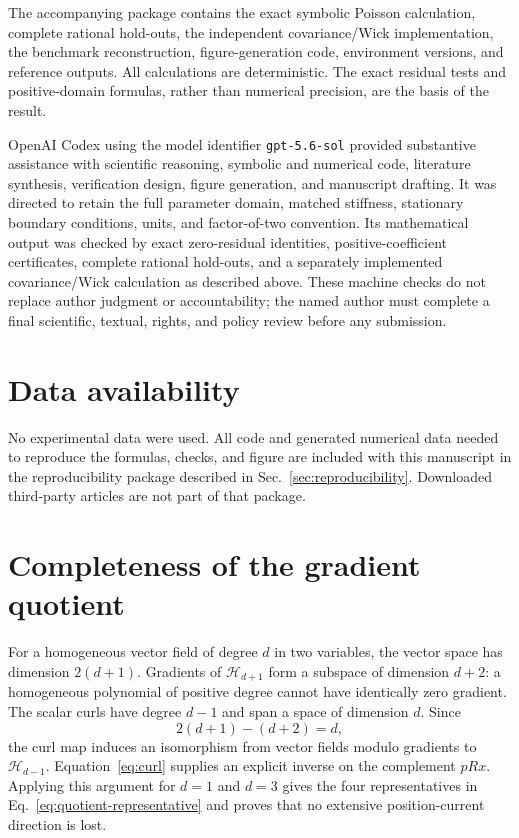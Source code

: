 \documentclass[aps,pre,reprint,amsmath,amssymb,superscriptaddress,nofootinbib]{revtex4-2}
\newcommand{\cH}{\mathcal{H}}
\begin{document}
The accompanying package contains the exact symbolic Poisson calculation,
complete rational hold-outs, the independent covariance/Wick implementation,
the benchmark reconstruction, figure-generation code, environment versions,
and reference outputs.  All calculations are deterministic.  The exact
residual tests and positive-domain formulas, rather than numerical precision,
are the basis of the result.

OpenAI Codex using the model identifier \texttt{gpt-5.6-sol} provided
substantive assistance with scientific reasoning, symbolic and numerical code,
literature synthesis, verification design, figure generation, and manuscript
drafting.  It was directed to retain the full parameter domain, matched
stiffness, stationary boundary conditions, units, and factor-of-two convention.
Its mathematical output was checked by exact zero-residual identities,
positive-coefficient certificates, complete rational hold-outs, and a
separately implemented covariance/Wick calculation as described above.  These
machine checks do not replace author judgment or accountability; the named
author must complete a final scientific, textual, rights, and policy review
before any submission.

\section*{Data availability}

No experimental data were used.  All code and generated numerical data needed
to reproduce the formulas, checks, and figure are included with this manuscript
in the reproducibility package described in Sec.~\ref{sec:reproducibility}.
Downloaded third-party articles are not part of that package.

\appendix

\section{Completeness of the gradient quotient}
\label{app:quotient}

For a homogeneous vector field of degree $d$ in two variables, the vector
space has dimension $2(d+1)$.  Gradients of $\cH_{d+1}$ form a subspace of
dimension $d+2$: a homogeneous polynomial of positive degree cannot have
identically zero gradient.  The scalar curls have degree $d-1$ and span a
space of dimension $d$.  Since
\begin{equation}
 2(d+1)-(d+2)=d,
\end{equation}
the curl map induces an isomorphism from vector fields modulo gradients to
$\cH_{d-1}$.  Equation~\eqref{eq:curl} supplies an explicit inverse on the
complement $pRx$.  Applying this argument for $d=1$ and $d=3$ gives the
four representatives in Eq.~\eqref{eq:quotient-representative} and proves that
no extensive position-current direction is lost.
\end{document}
